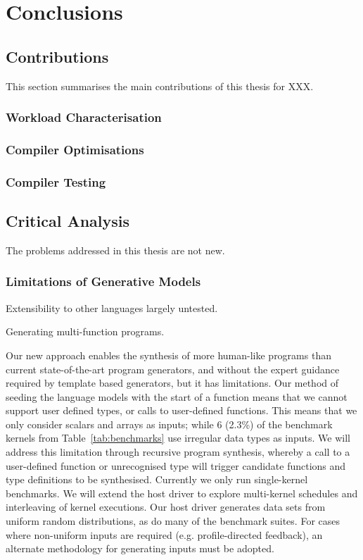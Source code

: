 \chapter{Conclusions}
\label{chap:conclusions}


\section{Contributions}

This section summarises the main contributions of this thesis for XXX.


\subsection{Workload Characterisation}


\subsection{Compiler Optimisations}


\subsection{Compiler Testing}


\section{Critical Analysis}

The problems addressed in this thesis are not new.


\subsection{Limitations of Generative Models}

Extensibility to other languages largely untested.

Generating multi-function programs.


 Our new approach enables the synthesis of more human-like programs than current state-of-the-art program generators, and without the expert guidance required by template based generators, but it has limitations. Our method of seeding the language models with the start of a function means that we cannot support user defined types, or calls to user-defined functions. This means that we only consider scalars and arrays as inputs; while 6 (2.3\%) of the benchmark kernels from Table~\ref{tab:benchmarks} use irregular data types as inputs. We will address this limitation through recursive program synthesis, whereby a call to a user-defined function or unrecognised type will trigger candidate functions and type definitions to be synthesised. Currently we only run single-kernel benchmarks. We will extend the host driver to explore multi-kernel schedules and interleaving of kernel executions. Our host driver generates data sets from uniform random distributions, as do many of the benchmark suites. For cases where non-uniform inputs are required (e.g. profile-directed feedback), an alternate methodology for generating inputs must be adopted.

